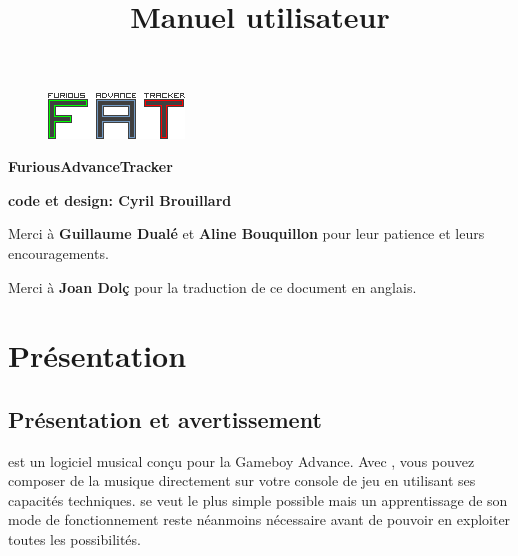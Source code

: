 \documentclass[12pt,a4paper]{article}
\title{\bf \SimpleImage{images/furicat_color}{0.3} \\ Manuel utilisateur}
\author{\fatversion}
\begin{document}
  \begin{figure}
    \begin{center}
    \includegraphics[scale=2]{images/logo}
    \end{center}
  \end{figure}
  \maketitle{}
  \thispagestyle{empty}
  \setcounter{page}{0}
  \ClearShipoutPicture

  \newpage

  \begin{center}
  
  {\bf \FAT FuriousAdvanceTracker} \medskip
  
  {\bf \fatversion} \medskip
  
  {\bf code et design: Cyril Brouillard} \medskip
  
  Merci à {\bf \textcolor{vert}{Guillaume Dualé}} et {\bf \textcolor{vert}{Aline Bouquillon}} pour leur patience et leurs encouragements.\medskip
  
  Merci à {\bf \textcolor{vert}{Joan Dolç}} pour la traduction de ce document en anglais.
  \end{center}
  
  \thispagestyle{empty}
  \setcounter{page}{0}
  \ClearShipoutPicture
  \newpage
  
  \tableofcontents{}
  \newpage
  
  \section{Présentation}
    \subsection{Présentation et avertissement}
    \FAT est un logiciel musical conçu pour la Gameboy Advance. Avec \FAT, vous pouvez composer de la musique directement sur votre console de jeu en utilisant ses capacités techniques. \FAT se veut le plus simple possible mais un apprentissage de son mode de fonctionnement reste néanmoins nécessaire avant de pouvoir en exploiter toutes les possibilités.\medskip
    
\end{document}
